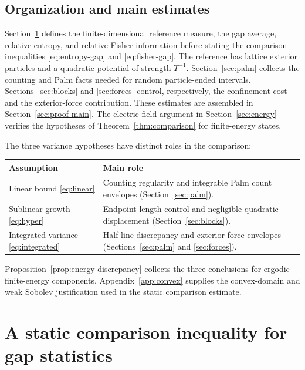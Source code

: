 \documentclass[11pt,reqno]{amsart}
\numberwithin{equation}{section}
\theoremstyle{definition}
\theoremstyle{remark}
\newcommand{\1}{\mathbf 1}
\begin{document}
\subsection{Organization and main estimates}

Section~\ref{sec:entropy} defines the finite-dimensional reference measure,
the gap average, relative entropy, and relative Fisher information before
stating the comparison inequalities \eqref{eq:entropy-gap} and
\eqref{eq:fisher-gap}. The reference has lattice exterior particles and
a quadratic potential of strength $T^{-1}$. Section~\ref{sec:palm} collects the
counting and Palm facts needed for random particle-ended intervals.
Sections~\ref{sec:blocks} and \ref{sec:forces} control, respectively, the
confinement cost and the exterior-force contribution. These estimates
are assembled in Section~\ref{sec:proof-main}. The electric-field
argument in Section~\ref{sec:energy} verifies the hypotheses of
Theorem~\ref{thm:comparison} for finite-energy states.


The three variance hypotheses have distinct roles in the comparison:
\begin{center}
\renewcommand{\arraystretch}{1.2}
\begin{tabular}{@{}p{}p{}@{}}
\hline
Assumption & Main role \\
\hline
Linear bound \eqref{eq:linear}
& Counting regularity and integrable Palm count envelopes
(Section~\ref{sec:palm}). \\
Sublinear growth \eqref{eq:hyper}
& Endpoint-length control and negligible quadratic displacement
(Section~\ref{sec:blocks}). \\
Integrated variance \eqref{eq:integrated}
& Half-line discrepancy and exterior-force envelopes
(Sections~\ref{sec:palm} and \ref{sec:forces}). \\
\hline
\end{tabular}
\end{center}
Proposition~\ref{prop:energy-discrepancy} collects the three conclusions
for ergodic finite-energy components. Appendix~\ref{app:convex} supplies
the convex-domain and weak Sobolev justification used in the static
comparison estimate.

\section{A static comparison inequality for gap statistics}
\label{sec:entropy}
\end{document}
